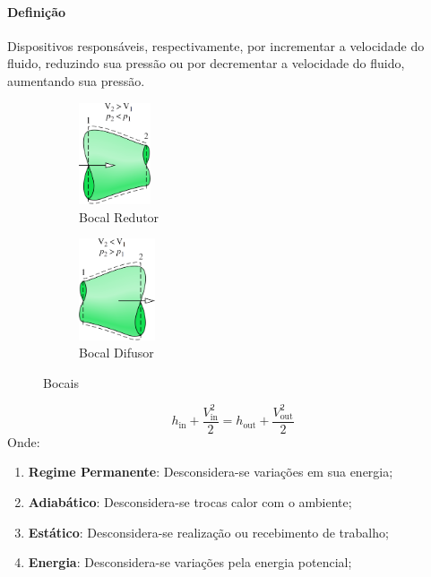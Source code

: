 \documentclass{article}
\begin{document}
            \paragraph{Definição}Dispositivos responsáveis, respectivamente, por incrementar a velocidade do fluido, reduzindo sua pressão ou por decrementar a velocidade do fluido, aumentando sua pressão.
                \begin{figure}[h]
                    \begin{subfigure}[t]{0.5\textwidth}
                        \centering
                        \includegraphics[height = 3cm]{Bocal Redutor.png}
                        \caption{Bocal Redutor}
                    \end{subfigure}
                    \begin{subfigure}[t]{0.5\textwidth}
                        \centering
                        \includegraphics[height = 3cm]{Bocal Difusor.png}
                        \caption{Bocal Difusor}
                    \end{subfigure}
                    \caption{Bocais}
                \end{figure}
                \[\boxed{
                    h_{\text{in}} + \frac{V^{2}_{\text{in}}}{2} =
                    h_{\text{out}} + \frac{V^{2}_{\text{out}}}{2}}\]
            Onde:
                \begin{enumerate}[noitemsep]
                    \item \textbf{Regime Permanente}: Desconsidera-se variações em sua energia;
                    \item \textbf{Adiabático}: Desconsidera-se trocas calor com o ambiente;
                    \item \textbf{Estático}: Desconsidera-se realização ou recebimento de trabalho;
                    \item \textbf{Energia}: Desconsidera-se variações pela energia potencial;
                \end{enumerate}
\end{document}
